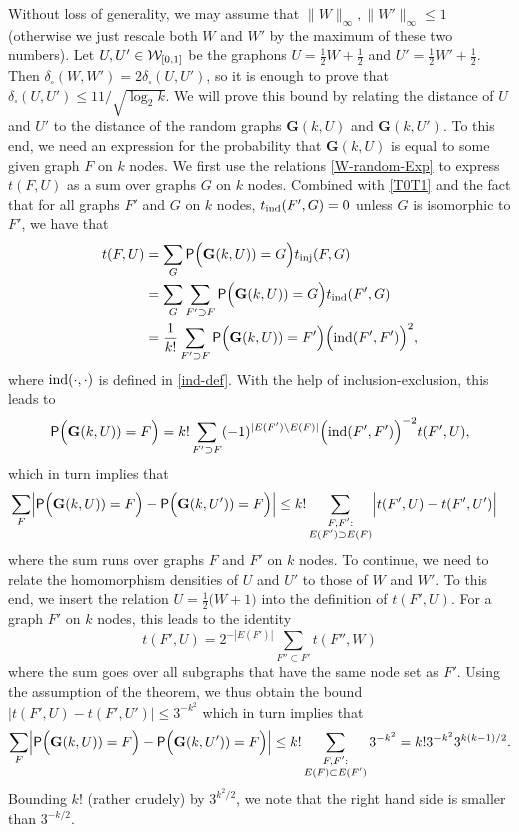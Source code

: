 \documentclass[12pt]{article}
\numberwithin{equation}{section}
\def\bsa{\begin{subarray}{c} }
\def\esa{\end{subarray} }
\def\inj{{\rm inj}}
\def\inj{{\rm inj}}
\def\ind{{\rm ind}}
\def\Prob{{\sf P}}
\def\bG{{\mathbf G}}
\def\WWz{{\WW_{[0,1]}}}
\begin{document}
Without loss of generality, we may assume that $\|W\|_\infty,
\|W'\|_\infty\leq 1$ (otherwise we just rescale both $W$ and $W'$ by
the maximum of these two numbers). Let $U,U'\in\WWz$ be the graphons
$U=\frac 1{2}W+\frac 12$ and $U'=\frac 1{2}W'+\frac 12$. Then
$\delta_\square(W, W')=2\delta_\square(U,U')$, so it is enough to
prove that $\delta_\square(U,U')\leq{ 11/\sqrt{\log_2 k}}$. We will
prove this bound by relating the distance of $U$ and $U'$ to the
distance of the random graphs $\bG(k,U)$ and $\bG(k,U')$.  To this
end, we need an expression for the probability that $\bG(k,U)$ is
equal to some given graph $F$ on $k$ nodes. We first use the
relations \eqref{W-random-Exp} to express $t(F,U)$ as a sum over
graphs $G$ on $k$ nodes.  Combined with \eqref{T0T1} and the fact
that for all graphs $F'$ and $G$ on $k$ nodes, $t_\ind(F',G)=0$
unless $G$ is isomorphic to $F'$, we have that
\[
\begin{aligned}
t(F,U)&=\sum_{G}\Prob\Bigl(\bG(k,U))=G\Bigr)t_\inj(F,G)
\\
&=\sum_{G}\sum_{F'\supset F} \Prob\Bigl(\bG(k,U))=G\Bigr)t_\ind(F',G)
\\
&=\frac 1{k!}\sum_{F'\supset F} \Prob\Bigl(\bG(k,U))=F'\Bigr)
\Bigl(\ind(F',F')\Bigr)^2,
\end{aligned}
\]
{where $\ind(\cdot,\cdot)$ is defined in \eqref{ind-def}.}
With the help of inclusion-exclusion, this leads to
\[
\begin{aligned}
\Prob\Bigl(\bG(k,U))=F\Bigr) =k!\sum_{F'\supset F}
(-1)^{|E(F')\setminus E(F)|} \Bigl(\ind(F',F')\Bigr)^{-2}t(F',U),
\end{aligned}
\]
which in turn implies that
\[
\begin{aligned}
&\sum_F\Bigl|\Prob\Bigl(\bG(k,U))=F\Bigr)-\Prob\Bigl(\bG(k,U'))=F\Bigr)\Bigr|
\leq k!\sum_{\bsa F,F':\\ E(F')\supset E(F)\esa}
\Bigl|t(F',U)-t(F',U')\Bigr|
\end{aligned}
\]
where the sum runs over graphs $F$ and $F'$ on $k$ nodes. To
continue, we need to relate the homomorphism densities of $U$ and
$U'$ to those of $W$ and $W'$. To this end, we insert the relation
$U=\frac 12\bigl(W+1\bigr)$ into the definition of $t(F',U)$. For a
graph $F'$ on $k$ nodes, this leads to the identity
\[
t(F',U)=2^{-|E(F')|}\sum_{F''\subset F'} t(F'',W)
\]
where the sum goes over all subgraphs  that have the same node set as
$F'$.  Using the assumption of the theorem, we thus obtain the bound
$ \bigl|t(F',U)-t(F',U')\bigr| \leq 3^{-k^2} $ which in turn implies
that
\[
\sum_F\Bigl|\Prob\Bigl(\bG(k,U))=F\Bigr)-\Prob\Bigl(\bG(k,U'))=F\Bigr)\Bigr|
\leq k!\sum_{\bsa F,F':\\ E(F)\subset E(F')\esa} 3^{-k^2}
=  k!3^{-k^2}3^{k(k-1)/2}.
\]
Bounding
$k!$ (rather crudely) by $3^{k^2/2}$, we note that the right
hand side is smaller than $3^{-k/2}$.
\end{document}
